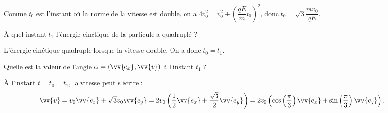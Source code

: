 
\begin{corrige}
Comme $t_0$ est l'instant  où la norme de la vitesse est double, on a $4v_{0}^{2}=v_{0}^{2}+\left(\dfrac{qE}{m}t_0\right)^{2}$, donc 
$t_0=\sqrt{3}\dfrac{mv_{0}}{qE}$.
\end{corrige}




\begin{enonce}
À quel instant $t_1$ l'énergie cinétique de la particule a quadruplé ? 
\end{enonce}


\begin{corrige}
L'énergie cinétique quadruple lorsque la vitesse double. On a donc $t_0 = t_1$.
\end{corrige}





\begin{enonce}
Quelle est la valeur de l'angle $\alpha=\left(\vv{e_{x}},\vv{v}\right)$ à l'instant $t_1$ ?
\end{enonce}


\begin{corrige}
À l'instant $t = t_0 = t_1$, la vitesse peut s'écrire :
\[
\vv{v}  =v_{0}\vv{e_{x}}+\sqrt{3}v_{0}\vv{e_{y}}=2v_{0}\left(\dfrac{1}{2}\vv{e_{x}}+\dfrac{\sqrt{3}}{2}\vv{e_{y}}\right)
 		=2v_{0}\left(\cos\left(\dfrac{\pi}{3}\right)\vv{e_{x}}+\sin\left(\dfrac{\pi}{3}\right)\vv{e_{y}}\right).
\]
\end{corrige}


\finEntrainement




